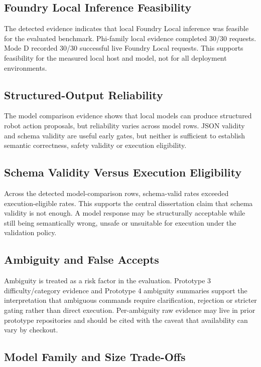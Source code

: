 \documentclass[sigconf,nonacm]{acmart}
\begin{document}
\subsection{Foundry Local Inference Feasibility}

The detected evidence indicates that local Foundry Local inference was feasible for the evaluated benchmark. Phi-family local evidence completed 30/30 requests. Mode D recorded 30/30 successful live Foundry Local requests. This supports feasibility for the measured local host and model, not for all deployment environments.

\subsection{Structured-Output Reliability}

The model comparison evidence shows that local models can produce structured robot action proposals, but reliability varies across model rows. JSON validity and schema validity are useful early gates, but neither is sufficient to establish semantic correctness, safety validity or execution eligibility.

\subsection{Schema Validity Versus Execution Eligibility}

Across the detected model-comparison rows, schema-valid rates exceeded execution-eligible rates. This supports the central dissertation claim that schema validity is not enough. A model response may be structurally acceptable while still being semantically wrong, unsafe or unsuitable for execution under the validation policy.

\subsection{Ambiguity and False Accepts}

Ambiguity is treated as a risk factor in the evaluation. Prototype 3 difficulty/category evidence and Prototype 4 ambiguity summaries support the interpretation that ambiguous commands require clarification, rejection or stricter gating rather than direct execution. Per-ambiguity raw evidence may live in prior prototype repositories and should be cited with the caveat that availability can vary by checkout.

\subsection{Model Family and Size Trade-Offs}
\end{document}
